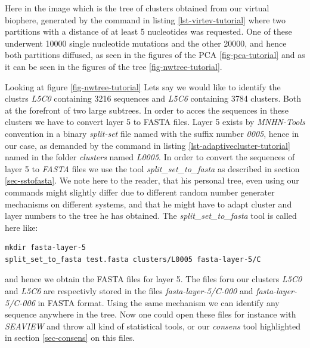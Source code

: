 Here in the image which is the tree of clusters obtained from our
virtual biophere, generated by the command in listing
\ref{lst-virtev-tutorial} where two partitions with a distance of at
least 5 nucleotides was requested. One of these underwent 10000 single
nucleotide mutations and the other 20000, and hence both partitions
diffused, as seen in the figures of the PCA \ref{fig-pca-tutorial} and as it
can be seen in the figures of the tree \ref{fig-nwtree-tutorial}.

Looking at figure \ref{fig-nwtree-tutorial}
Lets say we would like to identify the clustrs \emph{L5C0} containing
3216 sequences and \emph{L5C6} containing 3784 clusters. Both at the
forefront of two large subtrees. In order to acces the sequences in
these clusters we have to convert layer 5 to FASTA files. Layer 5
exists by \emph{MNHN-Tools} convention in a binary \emph{split-set}
file named with the suffix number \emph{0005}, hence in our case, as
demanded by the command in listing \ref{lst-adaptivecluster-tutorial}
named in the folder \emph{clusters} named \emph{L0005}. In order to
convert the sequences of layer 5 to \emph{FASTA} files we use the
tool \emph{split\_set\_to\_fasta} as described in section
\ref{sec-sstofasta}. We note here to the reader, that his personal tree, even
using our commands might slightly differ due to different random
number generater mechanisms on different systems, and that he might
have to adapt cluster and layer numbers to the tree he has obtained. 
The \emph{split\_set\_to\_fasta} tool is called here like:
\begin{lstlisting}
mkdir fasta-layer-5
split_set_to_fasta test.fasta clusters/L0005 fasta-layer-5/C
\end{lstlisting}
and hence we obtain the FASTA files for layer 5. The files foru our
clusters \emph{L5C0} and \emph{L5C6} are respectivly stored in the
files \emph{fasta-layer-5/C-000} and \emph{fasta-layer-5/C-006} in
FASTA format. Using the same mechanism we can identify any sequence
anywhere in the tree. Now one could open these files for instance with
\emph{SEAVIEW} and throw all kind of statistical tools, or our
\emph{consens} tool highlighted in section \ref{sec-consens} on this
files.

